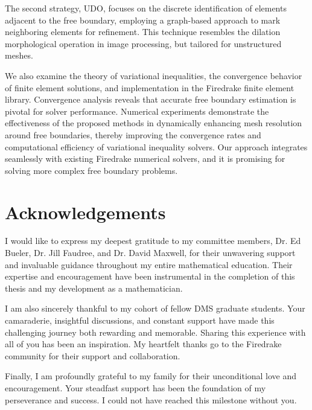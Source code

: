 \documentclass[12 pt]{report}
\begin{document}
The second strategy, UDO, focuses on the discrete identification of elements adjacent to the free boundary, employing a graph-based approach to mark neighboring elements for refinement. This technique resembles the dilation morphological operation in image processing, but tailored for unstructured meshes.

We also examine the theory of variational inequalities, the convergence behavior of finite element solutions, and implementation in the Firedrake finite element library. Convergence analysis reveals that accurate free boundary estimation is pivotal for solver performance. Numerical experiments demonstrate the effectiveness of the proposed methods in dynamically enhancing mesh resolution around free boundaries, thereby improving the convergence rates and computational efficiency of variational inequality solvers. Our approach integrates seamlessly with existing Firedrake numerical solvers, and it is promising for solving more complex free boundary problems.



\newpage

\chapter*{Acknowledgements}
I would like to express my deepest gratitude to my committee members, Dr. Ed Bueler, Dr. Jill Faudree, and Dr. David Maxwell, for their unwavering support and invaluable guidance throughout my entire mathematical education. Their expertise and encouragement have been instrumental in the completion of this thesis and my development as a mathematician.

I am also sincerely thankful to my cohort of fellow DMS graduate students. Your camaraderie, insightful discussions, and constant support have made this challenging journey both rewarding and memorable. Sharing this experience with all of you has been an inspiration. My heartfelt thanks go to the Firedrake community for their support and collaboration. 

Finally, I am profoundly grateful to my family for their unconditional love and encouragement. Your steadfast support has been the foundation of my perseverance and success. I could not have reached this milestone without you.
\noindent

\newpage


\renewcommand{\contentsname}{Table of Contents}
\tableofcontents
\newpage
\end{document}
